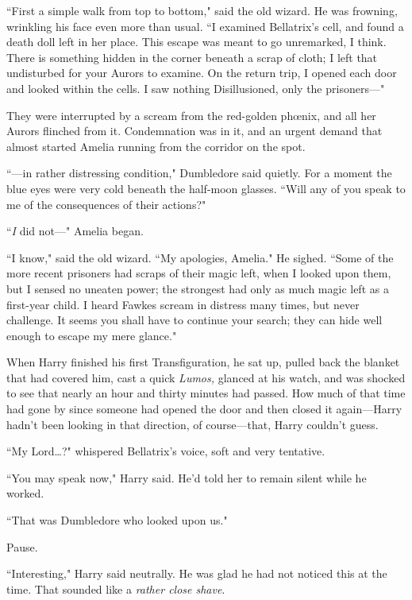 ``First a simple walk from top to bottom," said the old wizard. He was frowning, wrinkling his face even more than usual. ``I examined Bellatrix's cell, and found a death doll left in her place. This escape was meant to go unremarked, I think. There is something hidden in the corner beneath a scrap of cloth; I left that undisturbed for your Aurors to examine. On the return trip, I opened each door and looked within the cells. I saw nothing Disillusioned, only the prisoners---"

They were interrupted by a scream from the red-golden phœnix, and all her Aurors flinched from it. Condemnation was in it, and an urgent demand that almost started Amelia running from the corridor on the spot.

``---in rather distressing condition," Dumbledore said quietly. For a moment the blue eyes were very cold beneath the half-moon glasses. ``Will any of you speak to me of the consequences of their actions?"

``\emph{I} did not---" Amelia began.

``I know," said the old wizard. ``My apologies, Amelia." He sighed. ``Some of the more recent prisoners had scraps of their magic left, when I looked upon them, but I sensed no uneaten power; the strongest had only as much magic left as a first-year child. I heard Fawkes scream in distress many times, but never challenge. It seems you shall have to continue your search; they can hide well enough to escape my mere glance."

\later

When Harry finished his first Transfiguration, he sat up, pulled back the blanket that had covered him, cast a quick \emph{Lumos,} glanced at his watch, and was shocked to see that nearly an hour and thirty minutes had passed. How much of that time had gone by since someone had opened the door and then closed it again---Harry hadn't been looking in that direction, of course---that, Harry couldn't guess.

``My Lord{\ldots}?" whispered Bellatrix's voice, soft and very tentative.

``You may speak now," Harry said. He'd told her to remain silent while he worked.

``That was Dumbledore who looked upon us."

Pause.

``Interesting," Harry said neutrally. He was glad he had not noticed this at the time. That sounded like a \emph{rather close shave}.

